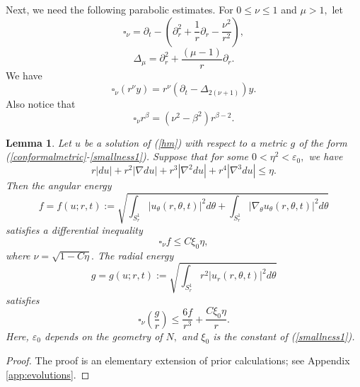 \documentclass[12pt]{amsart}
\newtheorem{lemma}[thm]{Lemma}
\theoremstyle{others}
\numberwithin{equation}{section}
\newcommand{\eps}{\varepsilon}
\renewcommand{\th}{\theta}
\newcommand{\p}{\partial}
\newcommand{\n}{\nabla}
\begin{document}
Next, we need the following parabolic estimates. For $0 \leq \nu \leq 1$ and $\mu > 1,$ let
$$\square_\nu = \p_t - \left( \p_r^2 + \frac{1}{r} \p_r - \frac{\nu^2}{r^2} \right),$$
$$\Delta_\mu =\p_r^2 + \frac{(\mu - 1)}{r} \p_r.$$
We have
\begin{equation}\label{squaretriangle}
\square_\nu \left( r^{\nu} y \right) = r^\nu \left( \p_t - \Delta_{2(\nu + 1)} \right) y.
\end{equation} 
Also notice that
\begin{equation}\label{squarerbeta}
\square_\nu \! r^\beta = \left( \nu^2 - \beta^2 \right) r^{\beta - 2}.
\end{equation}


\begin{lemma}\label{lemma:evolutions}
Let $u$ be a solution of (\ref{hm}) %
with respect to a metric $g$ of the form (\ref{conformalmetric}-\ref{smallness1}). Suppose that for some $0 < \eta^2 < \eps_0,$ %
 we have
\begin{equation}\label{evolutions:derivbounds}
r|du|+ r^2|\n du| + r^3|\n^2 du| + r^4|\n^3 du| \le \eta. %
\end{equation}
Then the angular energy
\begin{equation*}%
f = f(u;r, t) := \sqrt{ \int_{ S_r^1 } |u_\th (r,\theta,t)|^2 d\th + \int_{ S_r^1 } |\nabla_\theta u_\th (r,\theta,t)|^2 d\th }
\end{equation*}
satisfies a differential inequality
\begin{equation}\label{evolutions:angular}
\square_\nu \! f \le C \xi_0 \eta,
\end{equation}
where $\nu = \sqrt{1 - C \eta}.$
The radial energy
\begin{equation}\label{radialenergy}
g = g(u;r, t) := \sqrt{ \int_{ S_r^1 } r^2 |u_r (r,\theta,t)|^2 d\th }
\end{equation}
satisfies
\begin{equation}\label{evolutions:radial}
\square_\nu \! \left(\frac{g}{r} \right) \le \frac{6f}{r^3} + \frac{ C \xi_0 \eta}{r}.
\end{equation}
Here, $\varepsilon_0$ depends on the geometry of $N,$ and $\xi_0$ is the constant of (\ref{smallness1}).
\end{lemma}
\begin{proof} The proof is an elementary extension of prior calculations; see Appendix \ref{app:evolutions}.
\end{proof}
\end{document}
